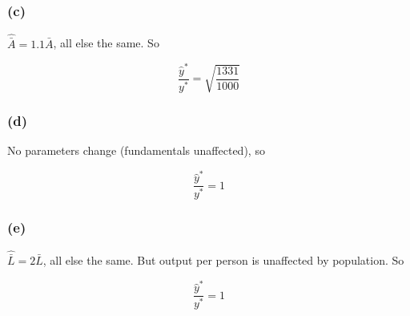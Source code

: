 \documentclass{article}
\begin{document}
\subsubsection*{(c)}

$\hat{\bar{A}} = 1.1\bar{A}$, all else the same. So

\[ \frac{\hat{y}^{*}}{y^{*}} = \sqrt{\frac{1331}{1000}} \]

\subsubsection*{(d)}

No parameters change (fundamentals unaffected), so

\[ \frac{\hat{y}^{*}}{y^{*}} = 1 \]

\subsubsection*{(e)}

$\hat{\bar{L}} = 2\bar{L}$, all else the same. But output per person is unaffected by population. So

\[ \frac{\hat{y}^{*}}{y^{*}} = 1 \]
\end{document}
